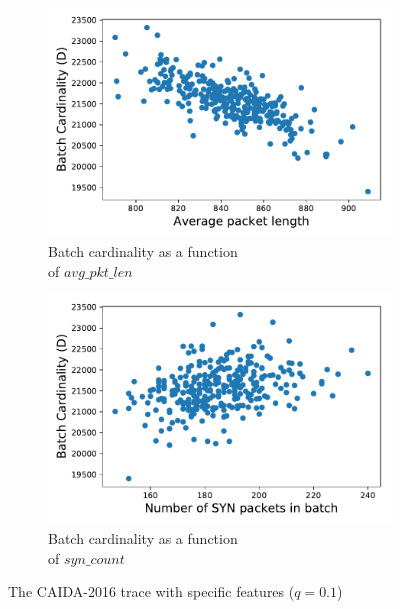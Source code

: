		\begin{figure}[!bt]
			\centering
			\begin{subfigure}{.49\textwidth}
				\centering
				\includegraphics[width=.95\linewidth]{img/len_vs_card_backbone.pdf}
				\captionsetup{justification=centering}
				\caption{Batch cardinality as a function \\ of $avg\_pkt\_len$}
				\label{fig:len_vs_card_backbone}
			\end{subfigure}
			\begin{subfigure}{.49\textwidth}
				\centering
				\includegraphics[width=.95\linewidth]{img/syn_vs_card_backbone.pdf}
				\captionsetup{justification=centering}
				\caption{Batch cardinality as a function \\ of $syn\_count$}
				\label{fig:syn_vs_card_backbone}
			\end{subfigure}
			\caption{The CAIDA-2016 trace with specific features ($q=0.1$)}
			\label{fig:tcp_feature}
		\end{figure}
		
